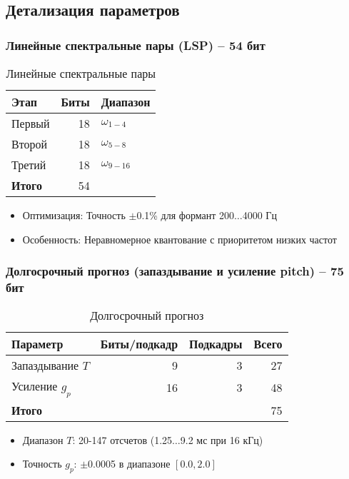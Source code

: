 \documentclass{report}
\begin{document}
	\subsection{Детализация параметров}
	
	\subsubsection{Линейные спектральные пары (LSP) -- 54 бит}
	
	\begin{table}[H]
		\centering
		\caption{Линейные спектральные пары}
		\begin{tabular}{lrl}
			\toprule
				Этап & Биты & Диапазон \\
			\midrule
				Первый & 18 & $\omega_{1-4}$ \\
				Второй & 18 & $\omega_{5-8}$ \\ 
				Третий & 18 & $\omega_{9-16}$ \\
			\bottomrule
				\textbf{Итого} & 54 & \\
			\bottomrule
		\end{tabular}
	\end{table}
	
	\begin{itemize}
		\item Оптимизация: Точность $\pm$0.1\% для формант 200$\ldots$4000 Гц
		\item Особенность: Неравномерное квантование с приоритетом низких частот
	\end{itemize}

	\subsubsection{Долгосрочный прогноз (запаздывание и усиление pitch) -- 75 бит}
	\begin{table}[H]
		\centering
		\caption{Долгосрочный прогноз}
		\begin{tabular}{lrrr}
			\toprule
				\textbf{Параметр} & \textbf{Биты/подкадр} & \textbf{Подкадры} & \textbf{Всего} \\
			\midrule
				Запаздывание $T$ & 9 & 3 & 27 \\
				Усиление $g_p$ & 16 & 3 & 48 \\
			\bottomrule
				\textbf{Итого} & & & 75 \\
			\bottomrule
		\end{tabular}
	\end{table}
	
	\begin{itemize}
		\item Диапазон $T$: 20-147 отсчетов (1.25$\ldots$9.2 мс при 16 кГц)
		\item Точность $g_p$: $\pm$0.0005 в диапазоне $[0.0, 2.0]$
	\end{itemize}
\end{document}
